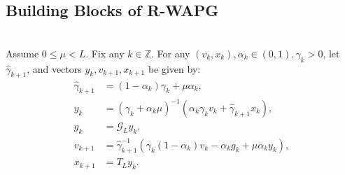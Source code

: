 \documentclass[12pt]{article}
\begin{document}
    \subsection{Building Blocks of R-WAPG}
        \begin{definition}\label{def:stepwise-wapg}\;\\
            Assume $0 \le \mu < L$.
            Fix any $k \in \mathbb Z$. 
            For any $(v_k, x_k), \alpha_k \in (0, 1), \gamma_k > 0$, let $\hat \gamma_{k + 1}$, and vectors $y_k, v_{k + 1}, x_{k + 1}$ be given by: 
            \begin{align*}
                \hat \gamma_{k + 1} &= (1 - \alpha_k)\gamma_k + \mu \alpha_k, 
                \\
                y_k &= 
                (\gamma_k + \alpha_k \mu)^{-1}(\alpha_k \gamma_k v_k + \hat\gamma_{k + 1} x_k), 
                \\
                g_k &= \mathcal G_L y_k, 
                \\
                v_{k + 1} &= \hat\gamma^{-1}_{k + 1}
                (\gamma_k(1 - \alpha_k) v_k - \alpha_k g_k + \mu \alpha_k y_k), 
                \\
                x_{k + 1} &= T_L y_k. 
            \end{align*}
        \end{definition}
\end{document}

